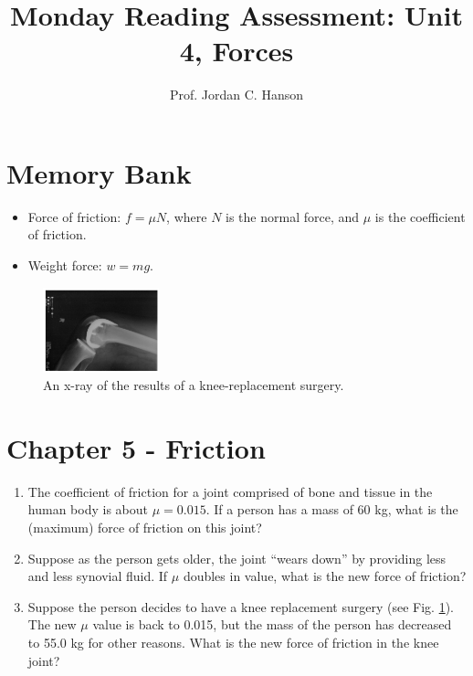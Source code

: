 \documentclass{article}
\begin{document}
\title{Monday Reading Assessment: Unit 4, Forces}
\author{Prof. Jordan C. Hanson}

\maketitle

\section{Memory Bank}

\begin{itemize}
\item Force of friction: $f = \mu N$, where $N$ is the normal force, and $\mu$ is the coefficient of friction.
\item Weight force: $w = mg$.
\end{itemize}
\begin{figure}[ht]
\centering
\includegraphics[width=0.3\textwidth]{bone.png}
\caption{\label{fig:bone} An x-ray of the results of a knee-replacement surgery.}
\end{figure}
\section{Chapter 5 - Friction}
\begin{enumerate}
\item The coefficient of friction for a joint comprised of bone and tissue in the human body is about $\mu = 0.015$.  If a person has a mass of 60 kg, what is the (maximum) force of friction on this joint? \\ \vspace{2cm}
\item Suppose as the person gets older, the joint ``wears down'' by providing less and less synovial fluid.  If $\mu$ doubles in value, what is the new force of friction? \\ \vspace{2cm}
\item Suppose the person decides to have a knee replacement surgery (see Fig. \ref{fig:bone}).  The new $\mu$ value is back to 0.015, but the mass of the person has decreased to 55.0 kg for other reasons.  What is the new force of friction in the knee joint?
\end{enumerate}
\end{document}
